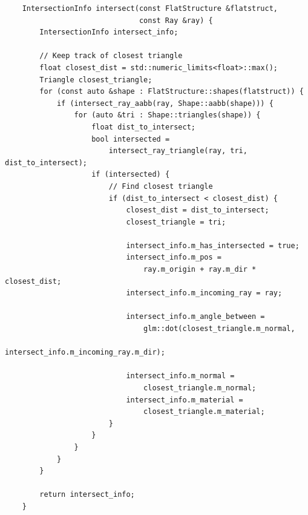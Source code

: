 \documentclass[
  twoside,
  11pt, a4paper,
  footinclude=true,
  headinclude=true,
  cleardoublepage=empty
]{scrreprt}
\begin{document}
\begin{verbatim}
    IntersectionInfo intersect(const FlatStructure &flatstruct,
                               const Ray &ray) {
        IntersectionInfo intersect_info;

        // Keep track of closest triangle
        float closest_dist = std::numeric_limits<float>::max();
        Triangle closest_triangle;
        for (const auto &shape : FlatStructure::shapes(flatstruct)) {
            if (intersect_ray_aabb(ray, Shape::aabb(shape))) {
                for (auto &tri : Shape::triangles(shape)) {
                    float dist_to_intersect;
                    bool intersected = 
                        intersect_ray_triangle(ray, tri, dist_to_intersect);
                    if (intersected) {
                        // Find closest triangle
                        if (dist_to_intersect < closest_dist) {
                            closest_dist = dist_to_intersect;
                            closest_triangle = tri;

                            intersect_info.m_has_intersected = true;
                            intersect_info.m_pos =
                                ray.m_origin + ray.m_dir * closest_dist;
                            intersect_info.m_incoming_ray = ray;

                            intersect_info.m_angle_between =
                                glm::dot(closest_triangle.m_normal,
                                         intersect_info.m_incoming_ray.m_dir);

                            intersect_info.m_normal =
                                closest_triangle.m_normal;
                            intersect_info.m_material =
                                closest_triangle.m_material;
                        }
                    }
                }
            }
        }

        return intersect_info;
    }
\end{verbatim} 
\begingroup
{}
\endgroup
\end{document}
